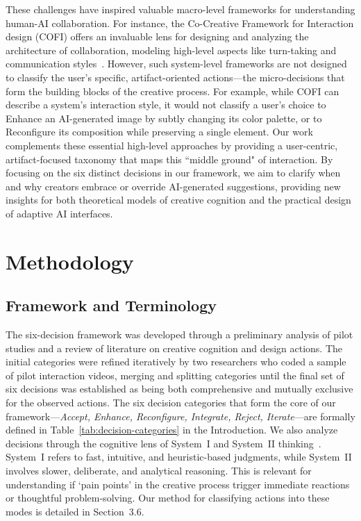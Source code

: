 \documentclass[letterpaper]{article} %
\begin{document}
These challenges have inspired valuable macro-level frameworks for understanding human-AI collaboration. For instance, the Co-Creative Framework for Interaction design (COFI) offers an invaluable lens for designing and analyzing the architecture of collaboration, modeling high-level aspects like turn-taking and communication styles~\cite{rezwana2023designing}. However, such system-level frameworks are not designed to classify the user's specific, artifact-oriented actions—the micro-decisions that form the building blocks of the creative process. For example, while COFI can describe a system’s interaction style, it would not classify a user’s choice to Enhance an AI-generated image by subtly changing its color palette, or to Reconfigure its composition while preserving a single element. Our work complements these essential high-level approaches by providing a user-centric, artifact-focused taxonomy that maps this “middle ground" of interaction. By focusing on the six distinct decisions in our framework, we aim to clarify when and why creators embrace or override AI-generated suggestions, providing new insights for both theoretical models of creative cognition and the practical design of adaptive AI interfaces.
\section{Methodology}

\subsection{Framework and Terminology}
The six-decision framework was developed through a preliminary analysis of pilot studies and a review of literature on creative cognition and design actions. The initial categories were refined iteratively by two researchers who coded a sample of pilot interaction videos, merging and splitting categories until the final set of six decisions was established as being both comprehensive and mutually exclusive for the observed actions. The six decision categories that form the core of our framework—\textit{Accept, Enhance, Reconfigure, Integrate, Reject, Iterate}—are formally defined in Table~\ref{tab:decision-categories} in the Introduction. We also analyze decisions through the cognitive lens of System~I and System~II thinking~\cite{kahneman2011fast}. System~I refers to fast, intuitive, and heuristic-based judgments, while System~II involves slower, deliberate, and analytical reasoning. This is relevant for understanding if `pain points' in the creative process trigger immediate reactions or thoughtful problem-solving. Our method for classifying actions into these modes is detailed in Section~3.6.
\end{document}
